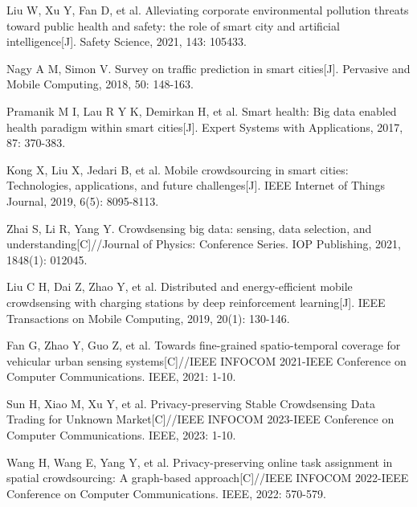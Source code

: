 \begin{thebibliography}{00}

 Liu W, Xu Y, Fan D, et al. Alleviating corporate environmental pollution threats toward public health and safety: the role of smart city and artificial intelligence[J]. Safety Science, 2021, 143: 105433.

 Nagy A M, Simon V. Survey on traffic prediction in smart cities[J]. Pervasive and Mobile Computing, 2018, 50: 148-163.

 Pramanik M I, Lau R Y K, Demirkan H, et al. Smart health: Big data enabled health paradigm within smart cities[J]. Expert Systems with Applications, 2017, 87: 370-383.

 Kong X, Liu X, Jedari B, et al. Mobile crowdsourcing in smart cities: Technologies, applications, and future challenges[J]. IEEE Internet of Things Journal, 2019, 6(5): 8095-8113.

 Zhai S, Li R, Yang Y. Crowdsensing big data: sensing, data selection, and understanding[C]//Journal of Physics: Conference Series. IOP Publishing, 2021, 1848(1): 012045.

 Liu C H, Dai Z, Zhao Y, et al. Distributed and energy-efficient mobile crowdsensing with charging stations by deep reinforcement learning[J]. IEEE Transactions on Mobile Computing, 2019, 20(1): 130-146.


 Fan G, Zhao Y, Guo Z, et al. Towards fine-grained spatio-temporal coverage for vehicular urban sensing systems[C]//IEEE INFOCOM 2021-IEEE Conference on Computer Communications. IEEE, 2021: 1-10.


Sun H, Xiao M, Xu Y, et al. Privacy-preserving Stable Crowdsensing Data Trading for Unknown Market[C]//IEEE INFOCOM 2023-IEEE Conference on Computer Communications. IEEE, 2023: 1-10.


 Wang H, Wang E, Yang Y, et al. Privacy-preserving online task assignment in spatial crowdsourcing: A graph-based approach[C]//IEEE INFOCOM 2022-IEEE Conference on Computer Communications. IEEE, 2022: 570-579.


\end{thebibliography}
